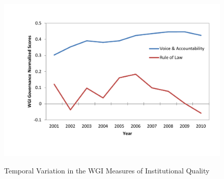 \begin{figure}[h]
	\centering
	\caption{Temporal Variation in the WGI Measures of Institutional Quality}	
\includegraphics[width=1.00\textwidth]{chapter01/InstitutionalVariations.pdf}
\label{fig:InstitutionalVariations}
\end{figure}


